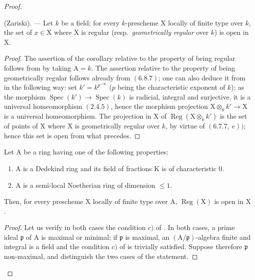 \begin{proof}
\begin{corollary}[6.12.5]
\label{IV.6.12.5}
\textnormal{(Zariski).} --- Let $k$ be a field; for every $k$-prescheme $\mathrm{X}$ locally
of finite type over $k$, the set of $x\in\mathrm{X}$ where $\mathrm{X}$ is regular (resp.\ \emph{geometrically regular} over $k$)
is open in $\mathrm{X}$.
\end{corollary}

\begin{proof}
The assertion of the corollary relative to the property of being regular follows from
 by taking $\mathrm{A}=k$. The assertion relative to the property of being geometrically
regular follows already from $(6.8.7)$; one can also deduce it from  in the following
way: set $k'=k^{p^{-\infty}}$ ($p$ being the characteristic exponent of $k$); as the morphism
$\operatorname{Spec}(k')\to\operatorname{Spec}(k)$ is radicial, integral and surjective, it is a universal homeomorphism
$(2.4.5)$, hence the morphism projection $\mathrm{X}\otimes_k k'\to\mathrm{X}$ is a universal homeomorphism.
The projection in $\mathrm{X}$ of $\operatorname{Reg}(\mathrm{X}\otimes_k k')$ is the set of points of $\mathrm{X}$ where $\mathrm{X}$ is geometrically
regular over $k$, by virtue of $(6.7.7,~e))$; hence this set is open from what
precedes.
\end{proof}

\begin{corollary}[6.12.6]
\label{IV.6.12.6}
Let $\mathrm{A}$ be a ring having one of the following properties:
\begin{enumerate}[label=(\roman*)]
  \item $\mathrm{A}$ is a Dedekind ring and its field of fractions $\mathrm{K}$ is of characteristic $0$.
  \item $\mathrm{A}$ is a semi-local Noetherian ring of dimension $\leqslant 1$.
\end{enumerate}
Then, for every prescheme $\mathrm{X}$ locally of finite type over $\mathrm{A}$, $\operatorname{Reg}(\mathrm{X})$ is open in $\mathrm{X}$.
\end{corollary}

\begin{proof}
Let us verify in both cases the condition $c)$ of . In both cases, a prime ideal
$\mathfrak{p}$ of $\mathrm{A}$ is maximal or minimal; if $\mathfrak{p}$ is maximal, an $(\mathrm{A}/\mathfrak{p})$-algebra finite and
integral is a field and the condition $c)$ of  is trivially satisfied. Suppose therefore
$\mathfrak{p}$ non-maximal, and distinguish the two cases of the statement.


\end{proof}
\end{proof}

